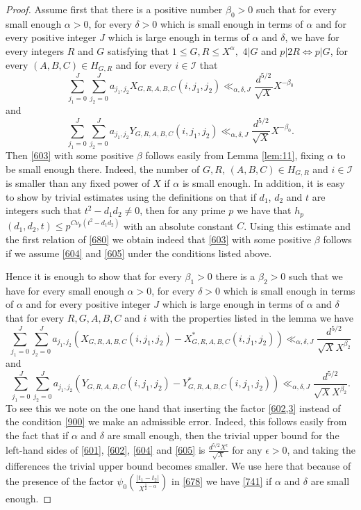 \documentclass[12pt]{amsart}
\theoremstyle{definition}
\numberwithin{equation}{section}
\begin{document}
\begin{proof}Assume first that there is a positive number
$\beta_0>0$ such that for every small enough $\alpha >0$, for every $
\delta >0$ which is small enough in terms of
$\alpha$ and for every positive integer $J$ which is large enough
in terms of $\alpha$ and $\delta$, we have for every integers $R$ and $
G$ satisfying that
$1\le G,R\le X^{\alpha},$ $4|G$ and $p|2R\Leftrightarrow p|G$, for every
$\left(A,B,C\right)\in H_{G,R}$ and for every $i\in\mathcal I$ that
\begin{equation}\sum_{j_1=0}^J\sum_{j_2=0}^Ja_{j_1,j_2}X_{G,R,A,B
,C}\left(i,j_1,j_2\right)\ll_{\alpha ,\delta ,J}\frac {d^{5/2}}{\sqrt {
X}}X^{-\beta_0}\label{604}\end{equation}
and
\begin{equation}\sum_{j_1=0}^J\sum_{j_2=0}^Ja_{j_1,j_2}Y_{G,R,A,B
,C}\left(i,j_1,j_2\right)\ll_{\alpha ,\delta ,J}\frac {d^{5/2}}{\sqrt {
X}}X^{-\beta_0}.\label{605}\end{equation}
Then \eqref{603} with some positive $\beta$ follows easily from Lemma \ref{lem:11},
fixing $\alpha$ to be small enough there. Indeed, the number of
$G,R$, $\left(A,B,C\right)\in H_{G,R}$ and $i\in\mathcal I$ is smaller than
any fixed power of $X$ if $\alpha$ is small enough. In addition,
it is easy to show by trivial estimates using the
definitions on \cite[pp 898-899]{biroClass} that if $d_1$, $d_2$ and $t$ are integers such that $t^2-d_1d_2\neq
0$,
then for any prime $p$ we have that
$h_p$$\left(d_1,d_2,t\right)\le p^{C\nu_p\left(t^2-d_1d_2\right)}$ with an absolute constant $
C$.
Using this estimate and the first relation of \eqref{680}
we obtain indeed that \eqref{603} with some positive $\beta$
follows if we assume \eqref{604} and \eqref{605} under
the conditions listed above.

Hence it is enough to show that for every $\beta_1>0$ there is
a $\beta_2>0$ such that we have for every small enough $\alpha >0$, for every $
\delta >0$ which is small enough in terms of
$\alpha$ and for every positive integer $J$ which is large enough
in terms of $\alpha$ and $\delta$ that for every $R,G,A,B,C$ and $
i$ with
the properties listed in the lemma we have
\[\sum_{j_1=0}^J\sum_{j_2=0}^Ja_{j_1,j_2}\left(X_{G,R,A,B,C}\left
(i,j_1,j_2\right)-X_{G,R,A,B,C}^{\ast}\left(i,j_1,j_2\right)\right
)\ll_{\alpha ,\delta ,J}\frac {d^{5/2}}{\sqrt {X}X^{\beta_2}}\]
and
\[\sum_{j_1=0}^J\sum_{j_2=0}^Ja_{j_1,j_2}\left(Y_{G,R,A,B,C}\left
(i,j_1,j_2\right)-Y_{G,R,A,B,C}^{\ast}\left(i,j_1,j_2\right)\right
)\ll_{\alpha ,\delta ,J}\frac {d^{5/2}}{\sqrt {X}X^{\beta_2}}.\]
To see this we note on the one hand that inserting the
factor \eqref{602,3} instead of the condition \eqref{900} we make an admissible error. Indeed, this
follows easily from the fact that if $\alpha$ and $\delta$ are small enough, then the trivial upper bound for
the left-hand sides of \eqref{601}, \eqref{602}, \eqref{604}
and \eqref{605} is $\frac {d^{5/2}X^{\epsilon}}{\sqrt {X}}$ for any $
\epsilon >0$, and taking the
differences the trivial upper bound becomes smaller. We
use here that because of the presence of the
factor $\psi_0\left(\frac {\left|t_1-t_2\right|}{X^{\frac 12-\alpha}}\right
)$ in \eqref{678} we have \eqref{741} if $\alpha$ and $\delta$ are small enough.


\end{proof}
\end{document}
